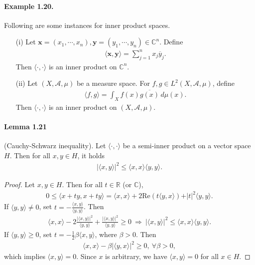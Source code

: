 \documentclass{article}
\renewcommand{\Re}{\mathrm{Re}}
\begin{document}
\paragraph{Example 1.20.\label{example:1.20}} Following are some instances for inner product spaces.
\begin{itemize}
	\item[(i)] Let $\mathbf{x}=(x_1,\cdots,x_n),\mathbf{y}=(y_1,\cdots,y_n)\in\mathbb{C}^n$. Define
	\begin{align*}
		\langle\mathbf{x},\mathbf{y}\rangle = \sum_{j=1}^n x_j\overline{y}_j.
	\end{align*}
    Then $\langle\cdot,\cdot\rangle$ is an inner product on $\mathbb{C}^n$.
    \item[(ii)] Let $(X,\mathscr{A},\mu)$ be a measure space. For $f,g\in L^2(X,\mathscr{A},\mu)$, define
    \begin{align*}
    	\langle f,g\rangle = \int_X f(x)\overline{g(x)}\,d\mu(x).
    \end{align*}
    Then $\langle\cdot,\cdot\rangle$ is an inner product on $(X,\mathscr{A},\mu)$.
\end{itemize}

\paragraph{Lemma 1.21\label{lemma:1.21}} (Cauchy-Schwarz inequality). Let $\langle\cdot,\cdot\rangle$ be a semi-inner product on a vector space $H$. Then for all $x,y\in H$, it holds
\begin{align*}
	\vert\langle x,y\rangle\vert^2\leq\langle x,x\rangle \langle y,y\rangle.
\end{align*}
\begin{proof}
Let $x,y\in H$. Then for all $t\in\mathbb{R}$ (or $\mathbb{C}$),
\begin{align*}
	0\leq\langle x+ty, x+ty\rangle = \langle x, x\rangle + 2\Re(t\langle y,x\rangle) + \vert t\vert^2\langle y, y\rangle.
\end{align*}
If $\langle y,y\rangle\neq 0$, set $t=-\frac{\langle x,y\rangle}{\langle y,y\rangle}$. Then
\begin{align*}
	\langle x, x\rangle - 2\frac{\vert\langle x,y\rangle\vert^2}{\langle y, y\rangle} + \frac{\vert\langle x,y\rangle\vert^2}{\langle y, y\rangle} \geq 0\ \Rightarrow\ \vert\langle x,y\rangle\vert^2\leq\langle x,x\rangle \langle y,y\rangle.
\end{align*}
If $\langle y,y\rangle\geq 0$, set $t=-\frac{1}{2}\beta\langle x,y\rangle$, where $\beta>0$. Then
\begin{align*}
	\langle x, x\rangle - \beta\vert\langle y,x\rangle\vert^2\geq 0,\ \forall\beta > 0,
\end{align*}
which implies $\langle x,y\rangle=0$. Since $x$ is arbitrary, we have $\langle x,y\rangle=0$ for all $x\in H$.
\end{proof}
\end{document}
